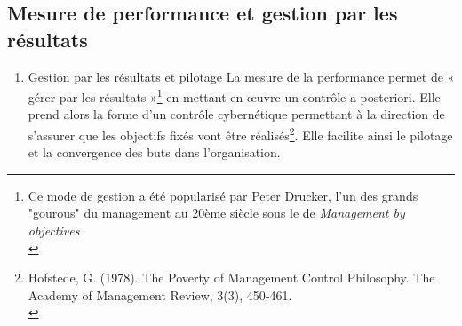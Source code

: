 \documentclass{tufte-handout}
\begin{document}
\subsection{Mesure de performance et gestion par les résultats}
\label{sec:org0415ed5}
\begin{enumerate}
\item Gestion par les résultats et pilotage
\label{sec:org8546124}
La mesure de la performance permet de « gérer par les résultats »\footnote{Ce mode de gestion a été popularisé par Peter Drucker, l'un des grands "gourous" du management au 20ème siècle sous le de \emph{Management by objectives}\\} en mettant en œuvre un contrôle a posteriori. Elle prend alors la forme d’un contrôle cybernétique permettant à la direction de s’assurer que les objectifs fixés vont être réalisés\footnote{Hofstede, G. (1978). The Poverty of Management Control Philosophy. The Academy of Management Review, 3(3), 450‑461.\\}. Elle facilite ainsi le pilotage et la convergence des buts dans l’organisation.\\


\end{enumerate}
\end{document}
